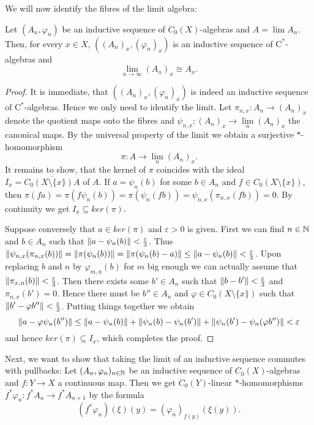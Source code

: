 	We will now identify the fibres of the limit algebra:
	\begin{lemma}
		Let $(A_n,\varphi_n)$ be an inductive sequence of $C_0(X)$-al\-gebras and $A=\lim A_n$. Then, for every $x\in X$, $((A_n)_x,(\varphi_n)_x)$ is an inductive sequence of $\mathrm{C}^*$-algebras and
		$$ \lim\limits_{n\rightarrow\infty} (A_n)_x\cong A_x.$$
	\end{lemma}
	\begin{proof}
		It is immediate, that $((A_n)_x,(\varphi_n)_x)$ is indeed an inductive sequence of $\mathrm{C}^*$-algebras. Hence we only need to identify the limit.
		Let $\pi_{n,x}:A_n\rightarrow (A_n)_x$ denote the quotient maps onto the fibres and $\psi_{n,x}:(A_n)_x\rightarrow \lim\limits_{n}(A_n)_x$ the canonical maps. By the universal property of the limit we obtain a surjective $*$-homo\-morphism $$\pi:A\rightarrow \lim\limits_{n}(A_n)_x.$$
		It remains to show, that the kernel of $\pi$ coincides with the ideal $I_x=\overline{C_0(X\setminus\lbrace x\rbrace)A}$ of $A$.
		If $a=\psi_n(b)$ for some $b\in A_n$ and $f\in C_0(X\setminus\lbrace x\rbrace)$, then $\pi(fa)=\pi(f\psi_n(b))=\pi(\psi_n(fb))=\psi_{n,x}(\pi_{n,x}(fb))=0$. By continuity we get $I_x\subseteq ker(\pi)$.
		
		Suppose conversely that $a\in ker(\pi)$ and $\varepsilon>0$ is given. First we can find $n\in\mathbb N$ and $b\in A_n$ such that $\lVert a-\psi_n(b)\rVert<\frac{\varepsilon}{3}$. Thus
		$\lVert\psi_{n,x}(\pi_{n,x}(b))\rVert=\lVert\pi(\psi_n(b))\rVert=\lVert\pi(\psi_n(b)-a)\rVert\leq \lVert a-\psi_n(b)\rVert<\frac{\varepsilon}{3}$.
		Upon replacing $b$ and $n$ by $\varphi_{m,n}(b)$ for $m$ big enough we can actually assume that $\lVert\pi_{x,n}(b)\rVert<\frac{\varepsilon}{3}$. Then there exists some $b'\in A_n$ such that $\lVert b-b'\rVert<\frac{\varepsilon}{3}$ and $\pi_{n,x}(b')=0$. Hence there must be $b''\in A_n$ and $\varphi\in C_0(X\setminus\lbrace x\rbrace)$ such that $\lVert b'-\varphi b''\rVert<\frac{\varepsilon}{3}$.
		Putting things together we obtain
		$$\lVert a-\varphi\psi_n(b'')\rVert\leq \lVert a- \psi_n(b)\rVert+\lVert\psi_n(b)-\psi_n(b')\rVert+\lVert\psi_n(b')-\psi_n(\varphi b'')\rVert<\varepsilon$$
		and hence $ker(\pi)\subseteq I_x$, which completes the proof.
	\end{proof}
	Next, we want to show that taking the limit of an inductive sequence commutes with pullbacks: Let $(A_n,\varphi_n)_{n\in\mathbb N}$ be an inductive sequence of $C_0(X)$-algebras and $f:Y\rightarrow X$ a continuous map. Then we get $C_0(Y)$-linear $*$-homo\-morphisms $f^*\varphi_n:f^*A_n\rightarrow f^* A_{n+1}$ by the formula $$(f^*\varphi_n)(\xi)(y)=(\varphi_n)_{f(y)}(\xi(y)).$$

